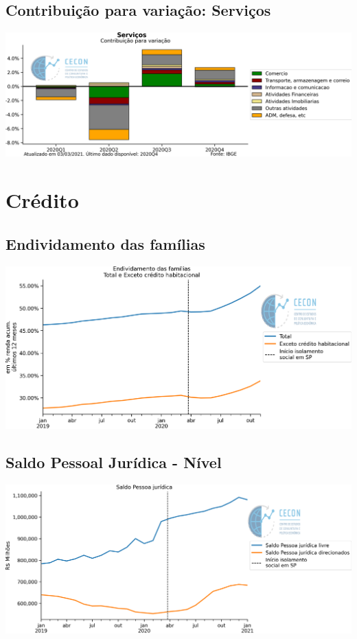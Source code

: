 \documentclass{SelfArx}
\begin{document}
\subsection*{Contribuição para variação: Serviços}
\label{sec:org61ac152}

\begin{center}
\includegraphics[width=.9\linewidth]{./figs/PIB/Contrib_Servicos.png}
\end{center}

\section*{Crédito}
\label{sec:org6d8d2ef}

\subsection*{Endividamento das famílias}
\label{sec:org3b30d32}

\begin{center}
\includegraphics[width=.9\linewidth]{./figs/Credito/EndividamentoFamilias.png}
\end{center}


\subsection*{Saldo Pessoal Jurídica - Nível}
\label{sec:org6d715ae}

\begin{center}
\includegraphics[width=.9\linewidth]{./figs/Credito/SaldoPJ.png}
\end{center}
\end{document}
